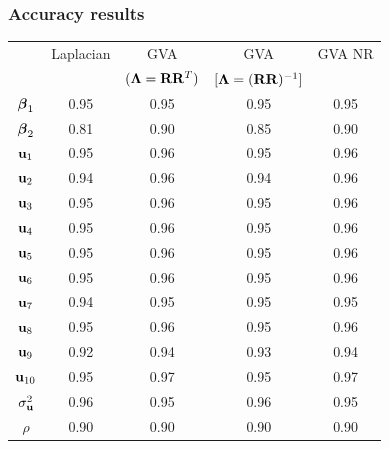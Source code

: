 \documentclass{beamer}
\begin{document}
\begin{frame}
	\frametitle{Accuracy results}
	\begin{tabular}{|c|cccc|}
		\hline
		               & Laplacian & GVA                    & GVA                         & GVA NR \\
		               &           & $({\boldsymbol \Lambda}={\bf R} {\bf R}^T)$ & $[{\boldsymbol \Lambda}=({\bf R} {\bf R})^{-1}]$ &        \\
		\hline
		${\boldsymbol \beta}_1$     & 0.95      & 0.95                   & 0.95                        & 0.95   \\
		${\boldsymbol \beta}_2$     & 0.81      & 0.90                   & 0.85                        & 0.90   \\
		${\bf u}_1$        & 0.95      & 0.96                   & 0.95                        & 0.96   \\
		${\bf u}_2$        & 0.94      & 0.96                   & 0.94                        & 0.96   \\
		${\bf u}_3$        & 0.95      & 0.96                   & 0.95                        & 0.96   \\
		${\bf u}_4$        & 0.95      & 0.96                   & 0.95                        & 0.96   \\
		${\bf u}_5$        & 0.95      & 0.96                   & 0.95                        & 0.96   \\
		${\bf u}_6$        & 0.95      & 0.96                   & 0.95                        & 0.96   \\
		${\bf u}_7$        & 0.94      & 0.95                   & 0.95                        & 0.95   \\
		${\bf u}_8$        & 0.95      & 0.96                   & 0.95                        & 0.96   \\
		${\bf u}_9$        & 0.92      & 0.94                   & 0.93                        & 0.94   \\
		${\bf u}_{10}$     & 0.95      & 0.97                   & 0.95                        & 0.97   \\
		$\sigma_{\bf u}^2$ & 0.96      & 0.95                   & 0.96                        & 0.95   \\
		$\rho$         & 0.90      & 0.90                   & 0.90                        & 0.90   \\
		\hline
	\end{tabular}
\end{frame}
\end{document}
